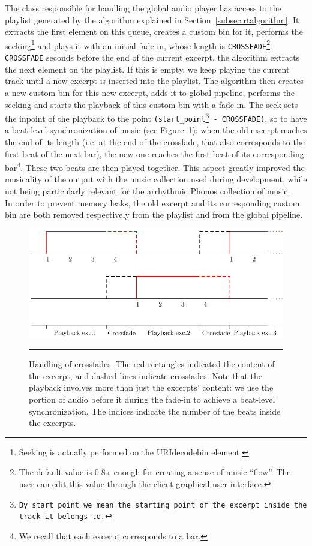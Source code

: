 The class responsible for handling the global audio player has access to the playlist generated by the algorithm explained in Section~\ref{subsec:rtalgorithm}. It extracts the first element on this queue, creates a custom bin for it, performs the seeking\footnote{Seeking is actually performed on the URIdecodebin element.} and plays it with an initial fade in, whose length is \texttt{CROSSFADE}\footnote{The default value is 0.8s, enough for creating a sense of music ``flow''. The user can edit this value through the client graphical user interface.}. \texttt{CROSSFADE} seconds before the end of the current excerpt, the algorithm extracts the next element on the playlist. If this is empty, we keep playing the current track until a new excerpt is inserted into the playlist. The algorithm then creates a new custom bin for this new excerpt, adds it to global pipeline, performs the seeking and starts the playback of this custom bin with a fade in. The seek sets the inpoint of the playback to the point \texttt{(start\_point\footnote{By \texttt{start\_point} we mean the starting point of the excerpt inside the track it belongs to.} - CROSSFADE)}, so to have a beat-level synchronization of music (see Figure~\ref{fig:crossfade}): when the old excerpt reaches the end of its length (i.e. at the end of the crossfade, that also corresponds to the first beat of the next bar), the new one reaches the first beat of its corresponding bar\footnote{We recall that each excerpt corresponds to a bar.}. These two beats are then played together. This aspect greatly improved the musicality of the output with the music collection used during development, while not being particularly relevant for the arrhythmic
 Phonos collection of music.\\
In order to prevent memory leaks, the old excerpt and its corresponding custom bin are both removed respectively from the playlist and from the global pipeline.\\
\begin{figure}[h]
\begin{center}
\includegraphics[scale=1]{Figures/crossfade.pdf}
    \rule{27em}{0.5pt}
  \caption[Crossfade handling]{Handling of crossfades. The red rectangles indicated the content of the excerpt, and dashed lines indicate crossfades. Note that the playback involves more than just the excerpts' content: we use the portion of audio before it during the fade-in to achieve a beat-level synchronization. The indices indicate the number of the beats inside the excerpts.}
  \label{fig:crossfade}
\end{center}
\end{figure}
